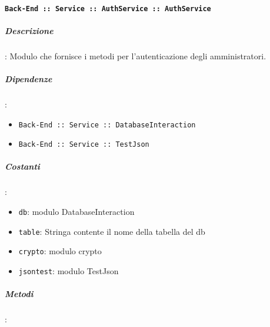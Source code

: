 \documentclass[../DefinizioneDiProdotto_v2.0.0.tex]{subfiles}
\begin{document}
\paragraph{\texttt{Back-End :: Service :: AuthService :: AuthService}}
\subparagraph{Descrizione}: Modulo che fornisce i metodi per l'autenticazione degli amministratori.
\subparagraph{Dipendenze}:
\begin{itemize}
	\item \texttt{Back-End :: Service :: DatabaseInteraction}
	\item \texttt{Back-End :: Service :: TestJson}
\end{itemize}
\subparagraph{Costanti}:
\begin{itemize}
	\item \texttt{db}: modulo DatabaseInteraction
	\item \texttt{table}: Stringa contente il nome della tabella del db
	\item \texttt{crypto}: modulo crypto
	\item \texttt{jsontest}: modulo TestJson
\end{itemize}
\subparagraph{Metodi}:
\end{document}
